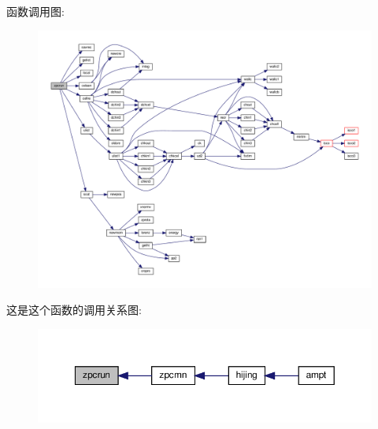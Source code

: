 函数调用图\+:
\nopagebreak
\begin{figure}[H]
\begin{center}
\leavevmode
\includegraphics[width=350pt]{zpcrun_8f90_a6db1195600e087fc4a81495f3d7ed045_cgraph}
\end{center}
\end{figure}
这是这个函数的调用关系图\+:
\nopagebreak
\begin{figure}[H]
\begin{center}
\leavevmode
\includegraphics[width=350pt]{zpcrun_8f90_a6db1195600e087fc4a81495f3d7ed045_icgraph}
\end{center}
\end{figure}
